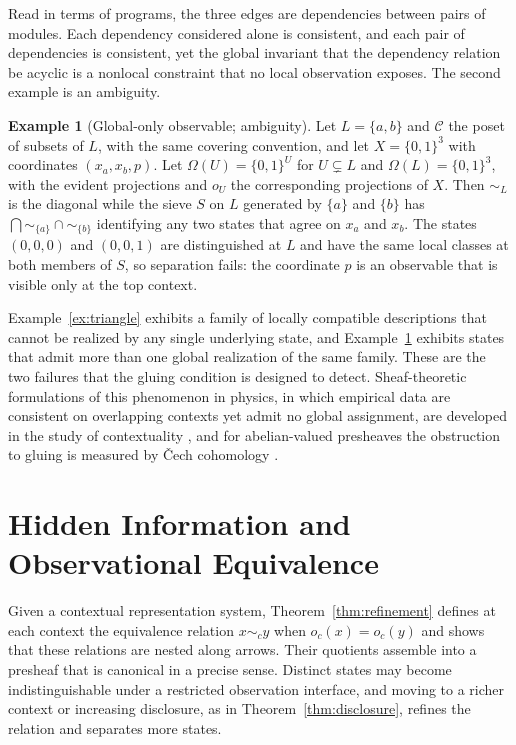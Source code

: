 \documentclass[11pt]{article}
\theoremstyle{definition}
\newtheorem{example}[theorem]{Example}
\theoremstyle{remark}
\newcommand{\cC}{\mathcal C}
\newcommand{\sk}{\sim}
\begin{document}
Read in terms of programs, the three edges are dependencies between pairs of modules. Each dependency considered alone is consistent, and each pair of dependencies is consistent, yet the global invariant that the dependency relation be acyclic is a nonlocal constraint that no local observation exposes. The second example is an ambiguity.

\begin{example}[Global-only observable; ambiguity]\label{ex:parity}
Let $L=\{a,b\}$ and $\cC$ the poset of subsets of $L$, with the same covering convention, and let $X=\{0,1\}^3$ with coordinates $(x_a,x_b,p)$. Let $\Omega(U)=\{0,1\}^U$ for $U\subsetneq L$ and $\Omega(L)=\{0,1\}^3$, with the evident projections and $o_U$ the corresponding projections of $X$. Then $\sk_L$ is the diagonal while the sieve $S$ on $L$ generated by $\{a\}$ and $\{b\}$ has $\bigcap\sk_{\{a\}}\cap\sk_{\{b\}}$ identifying any two states that agree on $x_a$ and $x_b$. The states $(0,0,0)$ and $(0,0,1)$ are distinguished at $L$ and have the same local classes at both members of $S$, so separation fails: the coordinate $p$ is an observable that is visible only at the top context.
\end{example}

Example~\ref{ex:triangle} exhibits a family of locally compatible descriptions that cannot be realized by any single underlying state, and Example~\ref{ex:parity} exhibits states that admit more than one global realization of the same family. These are the two failures that the gluing condition is designed to detect. Sheaf-theoretic formulations of this phenomenon in physics, in which empirical data are consistent on overlapping contexts yet admit no global assignment, are developed in the study of contextuality \cite{abramsky}, and for abelian-valued presheaves the obstruction to gluing is measured by \v{C}ech cohomology \cite{maclanemoerdijk}.

\section{Hidden Information and Observational Equivalence}

Given a contextual representation system, Theorem~\ref{thm:refinement} defines at each context the equivalence relation $x\sk_c y$ when $o_c(x)=o_c(y)$ and shows that these relations are nested along arrows. Their quotients assemble into a presheaf that is canonical in a precise sense. Distinct states may become indistinguishable under a restricted observation interface, and moving to a richer context or increasing disclosure, as in Theorem~\ref{thm:disclosure}, refines the relation and separates more states.
\end{document}
